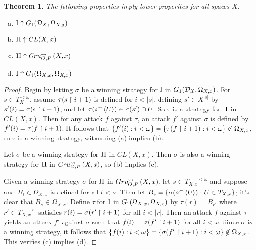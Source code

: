 \documentclass[11pt]{article}
\theoremstyle{plain}
\newtheorem{theorem}{Theorem}
\theoremstyle{definition}
\theoremstyle{remark}
\theoremstyle{plain}
\theoremstyle{definition}
\theoremstyle{remark}
\begin{document}
\begin{theorem}
The following properties imply lower properites for all spaces \(X\).
\begin{enumerate}[a)]
\item \(\mathrm{I}\uparrow G_{1}(\mathcal{D}_X,\Omega_{X,x})\)
\item \(\mathrm{II}\uparrow CL(X,x)\)
\item \(\mathrm{II}\uparrow Gru_{O,P}^{\leadsto}\left({X},{x}\right)\)
\item \(\mathrm{I}\uparrow G_{1}(\Omega_{X,x},\Omega_{X,x})\)
\end{enumerate}
\end{theorem}
\begin{proof}
Begin by letting \(\sigma\) be a winning strategy for
\(\mathrm{I}\) in \(G_{1}(\mathcal{D}_X,\Omega_{X,x})\).
For \(s\in T_{X}^{<\omega}\), assume \(\tau(s\restriction i+1)\) 
is defined for \(i<|s|\), defining \(s'\in X^{|s|}\)
by \(s'(i)=\tau(s\restriction i+1)\), and let
\(\tau(s{^\frown}\langle U\rangle)\in\sigma(s')\cap U\).
So \(\tau\) is a strategy for \(\mathrm{II}\) in \(CL(X,x)\).
Then for any attack \(f\) against \(\tau\),
an attack \(f'\) against \(\sigma\) is defined by
\(f'(i)=\tau(f\restriction i+1)\). It follows that
\(\{f'(i):i<\omega\}=\{\tau(f\restriction i+1):i<\omega\}\not\in\Omega_{X,x}\),
so \(\tau\) is a winning strategy, witnessing (a) implies (b).

Let \(\sigma\) be a winning strategy for \(\mathrm{II}\) in
\(CL(X,x)\). Then \(\sigma\) is also a winning strategy
for \(\mathrm{II}\) in \(Gru_{O,P}^{\leadsto}\left({X},{x}\right)\), so (b) implies (c).

Given a winning strategy \(\sigma\) for \(\mathrm{II}\) in
\(Gru_{O,P}^{\leadsto}\left({X},{x}\right)\), let \(s\in {T_{X,x}}^{<\omega}\) and suppose
and \(B_t\in\Omega_{X,x}\) is defined for all \(t<s\).
Then let \(B_s=\{\sigma(s{^\frown}\langle U\rangle):U\in T_{X,x}\}\);
it's clear that \(B_s\in\Omega_{X,x}\).
Define \(\tau\) for \(\mathrm{I}\) in \(G_{1}(\Omega_{X,x},\Omega_{X,x})\)
by \(\tau(r)=B_{r'}\) where \(r'\in {T_{X,x}}^{|r|}\) satisfies
\(r(i)=\sigma(r'\restriction i+1)\) for all \(i<|r|\). Then an attack \(f\)
against \(\tau\) yields an attack \(f'\) against \(\sigma\)
such that \(f(i)=\sigma(f'\restriction i+1)\) for all \(i<\omega\).
Since \(\sigma\) is a winning strategy, it follows that
\(\{f(i):i<\omega\}=\{\sigma(f'\restriction i+1):i<\omega\}\not\in\Omega_{X,x}\).
This verifies (c) implies (d).
\end{proof}
\end{document}
